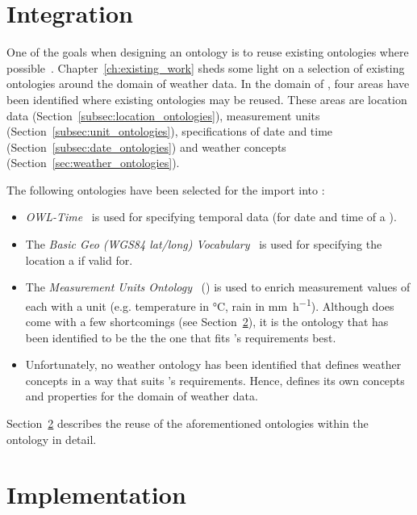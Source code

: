 \section{Integration}
\label{sec:integration}

One of the goals when designing an ontology is to reuse existing ontologies where possible~\cite{reuse1,reuse2}. Chapter~\ref{ch:existing_work} sheds some light on a selection of existing ontologies around the domain of weather data. In the domain of \smarthomeweather, four areas have been identified where existing ontologies may be reused. These areas are location data (Section~\ref{subsec:location_ontologies}), measurement units (Section~\ref{subsec:unit_ontologies}), specifications of date and time (Section~\ref{subsec:date_ontologies}) and weather concepts (Section~\ref{sec:weather_ontologies}).

The following ontologies have been selected for the import into \smarthomeweather:
\begin{itemize}
  \item \emph{OWL-Time}~\cite{owl-time} is used for specifying temporal data (for date and time of a ).
  \item The \emph{Basic Geo (WGS84 lat/long) Vocabulary}~\cite{wgs84_vocabulary} is used for specifying the location a  if valid for.
  \item The \emph{Measurement Units Ontology}~\cite{MUO} (\muo) is used to enrich measurement values of each  with a unit (e.g. temperature in \si{\celsius}, rain in \si{\milli\metre\per\hour}). Although \muo does come with a few shortcomings (see Section~\ref{sec:implementation}), it is the ontology that has been identified to be the the one that fits \smarthomeweather's requirements best.
  \item Unfortunately, no weather ontology has been identified that defines weather concepts in a way that suits \smarthomeweather's requirements. Hence, \smarthomeweather defines its own concepts and properties for the domain of weather data.
\end{itemize}

Section~\ref{sec:implementation} describes the reuse of the aforementioned ontologies within the \smarthomeweather ontology in detail.

\section{Implementation}
\label{sec:implementation}

